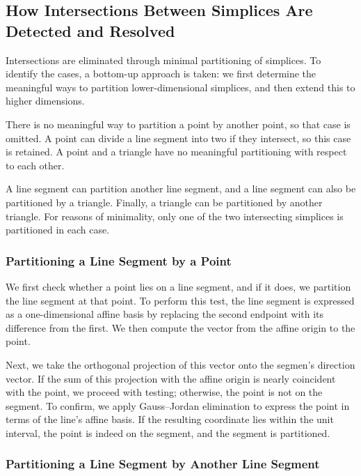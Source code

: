 \subsection{How Intersections Between Simplices Are Detected and Resolved}

Intersections are eliminated through minimal partitioning of simplices.  
To identify the cases, a bottom-up approach is taken: we first determine 
the meaningful ways to partition lower-dimensional simplices, and then 
extend this to higher dimensions.  

There is no meaningful way to partition a point by another point, so 
that case is omitted. A point can divide a line segment into two if they 
intersect, so this case is retained. A point and a triangle have no 
meaningful partitioning with respect to each other.  

A line segment can partition another line segment, and a line segment 
can also be partitioned by a triangle. Finally, a triangle can be 
partitioned by another triangle. For reasons of minimality, only one 
of the two intersecting simplices is partitioned in each case.

\subsubsection{Partitioning a Line Segment by a Point}

We first check whether a point lies on a line segment, and if it does, 
we partition the line segment at that point. To perform this test, the 
line segment is expressed as a one-dimensional affine basis by replacing 
the second endpoint with its difference from the first. We then compute 
the vector from the affine origin to the point.  

Next, we take the orthogonal projection of this vector onto the segmen's 
direction vector. If the sum of this projection with the affine origin is 
nearly coincident with the point, we proceed with testing; otherwise, the 
point is not on the segment. To confirm, we apply Gauss--Jordan elimination 
to express the point in terms of the line's affine basis. If the resulting 
coordinate lies within the unit interval, the point is indeed on the 
segment, and the segment is partitioned.

\subsubsection{Partitioning a Line Segment by Another Line Segment}

